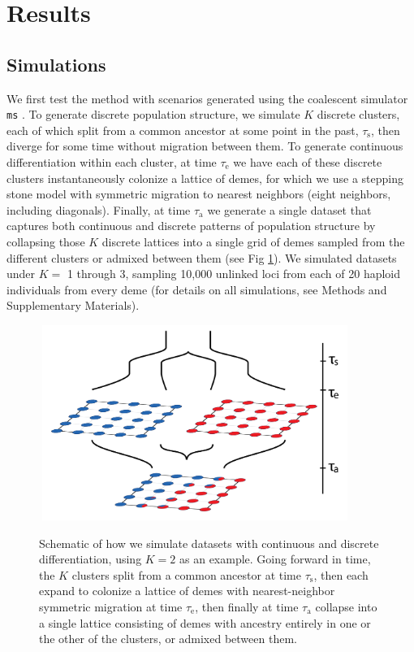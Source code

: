 \documentclass[12pt]{article}
\begin{document}
\section*{Results}

\subsection*{Simulations}
We first test the method with scenarios generated using the coalescent simulator \texttt{ms} \citep{Hudson2002}.
To generate discrete population structure, we simulate $K$ discrete clusters,
each of which split from a common ancestor at some point in the past, $\tau_{\text{s}}$,
then diverge for some time without migration between them.
To generate continuous differentiation within each cluster,
at time $\tau_{\text{e}}$ we have each of these discrete clusters instantaneously colonize a lattice of demes,
for which we use a stepping stone model with symmetric migration 
to nearest neighbors (eight neighbors, including diagonals).
Finally, at time $\tau_{\text{a}}$ we generate a single dataset that captures both continuous and discrete patterns of population structure 
by collapsing those $K$ discrete lattices into a single grid of demes sampled from the different clusters
or admixed between them (see Fig \ref{sim_setup}).
We simulated datasets under $K =$ 1 through 3, 
sampling 10,000 unlinked loci from each of 20 haploid individuals from every deme
(for details on all simulations, see Methods and Supplementary Materials).

\begin{figure}
	\centering
		{\includegraphics[width=4in,height=2.5in]{figs/sims/sim_setup.png}}
		\caption{Schematic of how we simulate datasets with continuous and discrete differentiation, using $K=2$ as an example.  
			    Going forward in time, the $K$ clusters split from a common ancestor at time $\tau_{\text{s}}$,
			    then each expand to colonize a lattice of demes with nearest-neighbor symmetric migration at time $\tau_{\text{e}}$,
			    then finally at time $\tau_{\text{a}}$ collapse into a single lattice consisting of demes 
			    with ancestry entirely in one or the other of the clusters,
			    or admixed between them.
			    }\label{sim_setup}
\end{figure}
\end{document}
